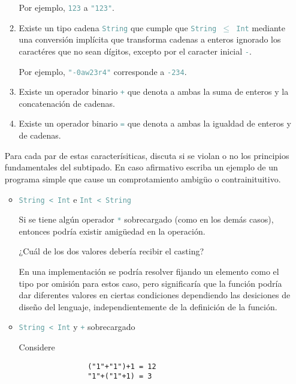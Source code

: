 \documentclass{article}
\newcommand{\tx}[1]{\textcolor{CadetBlue} {\texttt{#1}}}
\begin{document}
\begin{enumerate}
\begin{enumerate}
            Por ejemplo, \tx{123} a \tx{"123"}.

            \item Existe un tipo cadena \tx{String} que cumple que 
            \tx{String $\leq$ Int} mediante una conversión implícita que 
            transforma cadenas a enteros ignorado los caractéres que no sean
            dígitos, excepto por el caracter inicial \tx{-}.

            Por ejemplo, \tx{"}\tx{-0aw23r4"} corresponde a \tx{-234}.

            \item Existe un operador binario \tx{+} que denota a ambas la suma 
            de enteros y la concatenación de cadenas.

            \item Existe un operador binario \tx{=} que denota a ambas la 
            igualdad de enteros y de cadenas.
        \end{enumerate}

        Para cada par de estas caracterísiticas, discuta si se violan o no los 
        principios fundamentales del subtipado. En caso afirmativo escriba un
        ejemplo de un programa simple que cause un comprotamiento ambigüo o 
        contrainituitivo.

        \begin{itemize}
            \item \tx{String < Int} e \tx{Int < String}

            Si se tiene algún operador \tx{*} sobrecargado (como en los demás 
            casos), entonces podría existir amigüedad en la operación.

            ¿Cuál de los dos valores debería recibir el casting?

            En una implementación se podría resolver fijando un elemento como el
            tipo por omisión para estos caso, pero significaría que la función 
            podría dar diferentes valores en ciertas condiciones dependiendo las
            desiciones de diseño del lenguaje, independientemente de la
            definición de la función.

            \item \tx{String < Int} y \tx{+} sobrecargado

            Considere

            \begin{verbatim}
                ("1"+"1")+1 = 12
                "1"+("1"+1) = 3
            \end{verbatim}


\end{itemize}
\end{enumerate}
\end{document}
